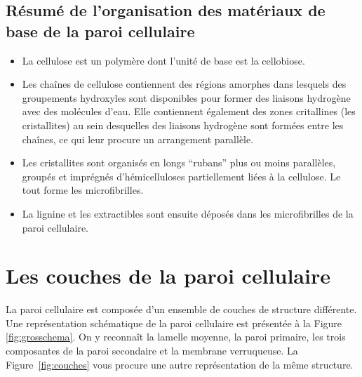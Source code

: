\subsection{Résumé de l'organisation des matériaux de base de la paroi cellulaire}

\begin{itemize}
\item La cellulose est un polymère dont l'unité de base est la cellobiose.
\item Les chaînes de cellulose contiennent des régions amorphes dans lesquels des groupements hydroxyles sont disponibles pour former des liaisons hydrogène avec des molécules d'eau. Elle contiennent également des zones critallines (les cristallites) au sein desquelles des liaisons hydrogène sont formées entre les chaînes, ce qui leur procure un arrangement parallèle.
\item Les cristallites sont organisés en longs “rubans” plus ou moins parallèles, groupés et imprégnés d'hémicelluloses partiellement liées à la cellulose. Le tout forme les microfibrilles.
\item La lignine et les extractibles sont ensuite déposés dans les microfibrilles de la paroi cellulaire.
\end{itemize}

\section{Les couches de la paroi cellulaire}

La paroi cellulaire est composée d'un ensemble de couches de structure différente. Une représentation schématique de la paroi cellulaire est présentée à la Figure \ref{fig:grosschema}. On y reconnaît la lamelle moyenne, la paroi primaire, les trois composantes de la paroi secondaire et la membrane verruqueuse. La Figure~\ref{fig:couches} vous procure une autre représentation de la même structure.

